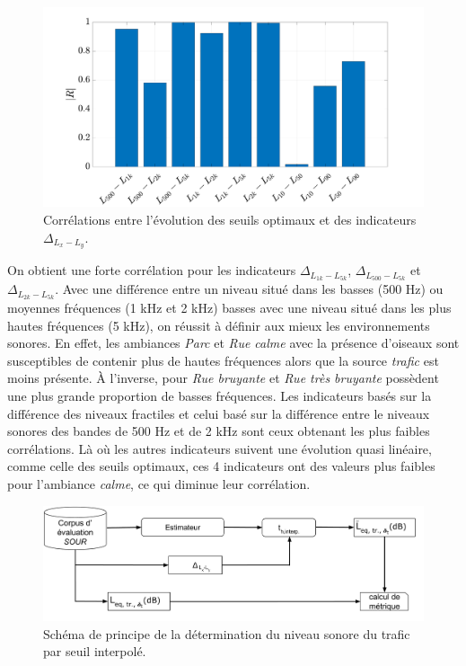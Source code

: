 \begin{figure}[h]
\centering
\includegraphics[width=0.9\linewidth]{./figures/resultats/Opt_correlation.pdf}
\caption{Corrélations entre l'évolution des seuils optimaux et des indicateurs $\Delta_{L_x-L_y}$.}
\label{fig:correlation}
\end{figure}

On obtient une forte corrélation pour les indicateurs $\Delta_{L_{1k}-L_{5k}}$, $\Delta_{L_{500}-L_{5k}}$ et $\Delta_{L_{2k}-L_{5k}}$. Avec une différence entre un niveau situé dans les basses (500 Hz) ou moyennes fréquences (1 kHz et 2 kHz) basses avec une niveau situé dans les plus hautes fréquences (5 kHz), on réussit à définir aux mieux les environnements sonores. En effet, les ambiances \textit{Parc} et \textit{Rue calme} avec la présence d'oiseaux sont susceptibles de contenir plus de hautes fréquences alors que la source \textit{trafic} est moins présente. À l'inverse, pour \textit{Rue bruyante} et \textit{Rue très bruyante} possèdent une plus grande proportion de basses fréquences. 
Les indicateurs basés sur la différence des niveaux fractiles et celui basé sur la différence entre le niveaux sonores des bandes de 500 Hz et de 2 kHz sont ceux obtenant les plus faibles corrélations. Là où les autres indicateurs suivent une évolution quasi linéaire, comme celle des seuils optimaux, ces 4 indicateurs ont des valeurs plus faibles pour l'ambiance \textit{calme}, ce qui diminue leur corrélation.

\begin{figure}[h]
\centering
\includegraphics[width=.9\linewidth]{./figures/NMF/bloc_diagram_interpolation.pdf}
\caption{Schéma de principe de la détermination du niveau sonore du trafic par seuil interpolé.}
\label{fig:schema_NMFIS_interp}
\end{figure}

